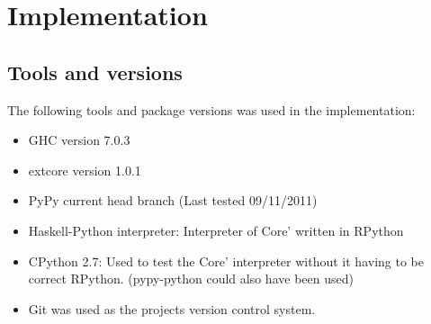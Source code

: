 
\section{Implementation}

\subsection{Tools and versions}

The following tools and package versions was used in the implementation:

\begin{itemize}
\item GHC version 7.0.3
\item extcore version 1.0.1
\item PyPy current head branch (Last tested 09/11/2011)
\item Haskell-Python interpreter: Interpreter of Core' written in RPython
\item CPython 2.7: Used to test the Core' interpreter without it having to be correct RPython.
(pypy-python could also have been used)
\item Git was used as the projects version control system.
\end{itemize}







